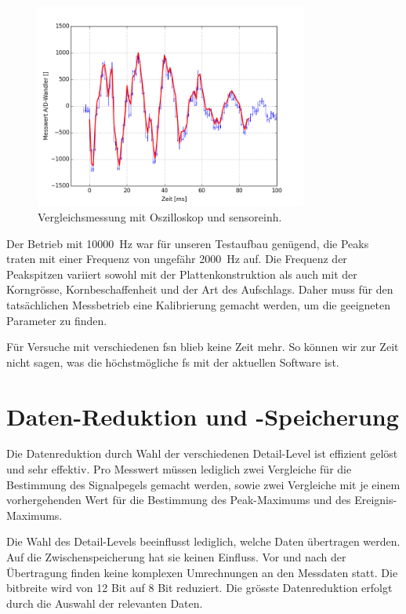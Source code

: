 \begin{figure}
	\centering
		\includegraphics[width=0.8\textwidth]{images/comparison/comparison.png}
	\caption{Vergleichsmessung mit Oszilloskop und \gls{sensoreinh}.}
	\label{fig.comparison2}
\end{figure}


Der Betrieb mit 10000~Hz war für unseren Testaufbau genügend, die Peaks traten mit einer Frequenz von ungefähr 2000~Hz auf. Die Frequenz der Peakspitzen variiert sowohl mit der Plattenkonstruktion als auch mit der Korngrösse, Kornbeschaffenheit und der Art des Aufschlags. Daher muss für den tatsächlichen Messbetrieb eine Kalibrierung gemacht werden, um die geeigneten Parameter zu finden.

Für Versuche mit verschiedenen \gls{fs}n blieb keine Zeit mehr. So können wir zur Zeit nicht sagen, was die höchstmögliche \gls{fs} mit der aktuellen Software ist.

\section{Daten-Reduktion und -Speicherung}
Die Datenreduktion durch Wahl der verschiedenen Detail-Level ist effizient gelöst und sehr effektiv. Pro Messwert müssen lediglich zwei Vergleiche für die Bestimmung des Signalpegels gemacht werden, sowie zwei Vergleiche mit je einem vorhergehenden Wert für die Bestimmung des Peak-Maximums und des Ereignis-Maximums.

Die Wahl des Detail-Levels beeinflusst lediglich, welche Daten übertragen werden. Auf die Zwischenspeicherung hat sie keinen Einfluss. Vor und nach der Übertragung finden keine komplexen Umrechnungen an den Messdaten statt. Die \gls{bitbreite} wird von 12 Bit auf 8 Bit reduziert. Die grösste Datenreduktion erfolgt durch die Auswahl der relevanten Daten.

